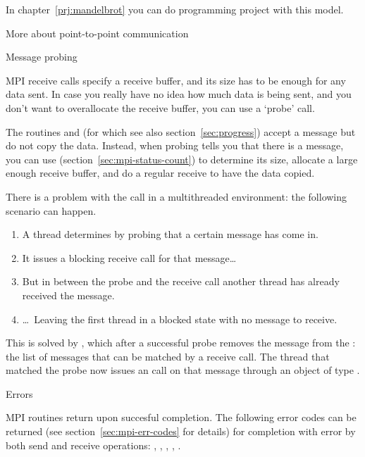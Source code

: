 In chapter~\ref{prj:mandelbrot} you can do programming project with
this model.


 {More about point-to-point communication}

 {Message probing}
\label{sec:mpi-probe}

MPI receive calls specify a receive buffer, and its size has to be
enough for any data sent. In case you really have no idea how much data
is being sent, and you don't want to overallocate the receive buffer,
you can use a `probe' call.

The routines  and 
(for which see also section~\ref{sec:progress})
accept a message but do not copy the data.
Instead, when probing tells you that there is a
message, you can use 
(section~\ref{sec:mpi-status-count})
to determine its size,
allocate a large enough receive buffer, and do a regular receive to
have the data copied.


There is a problem with the  call in a
multithreaded environment: the following scenario can happen.
\begin{enumerate}
\item A thread determines by probing that a certain message has come
  in.
\item It issues a blocking receive call for that message\dots
\item But in between the probe and the receive call another thread
  has already received the message.
\item \dots~Leaving the first thread in a blocked state with no
  message to receive.
\end{enumerate}
This is solved by , which after a successful
probe removes the message from the : the
list of messages that can be matched by a receive call. The thread
that matched the probe now issues an  call on
that message through an object of type .

 {Errors}

MPI routines return  upon succesful completion.
The following error codes can be returned
(see section~\ref{sec:mpi-err-codes} for details)
for completion with error by both send and receive operations:
  ,
  ,
  ,
  ,
  .


